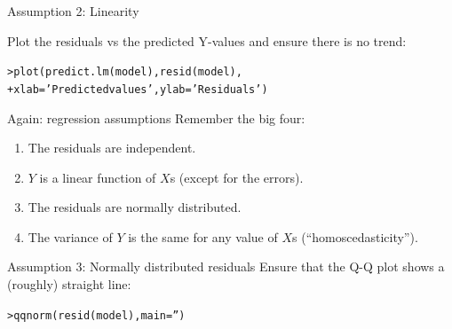 \documentclass{beamer}\usepackage[]{graphicx}\usepackage[]{color}
\makeatletter
\newcommand{\hlstr}[1]{\textcolor[rgb]{1,0.894,0.71}{#1}}%
\newcommand{\hlstd}[1]{\textcolor[rgb]{1,0.894,0.769}{#1}}%
\newcommand{\hlkwc}[1]{\textcolor[rgb]{0.78,0.941,0.545}{#1}}%
\newcommand{\hlkwd}[1]{\textcolor[rgb]{1,0.78,0.769}{#1}}%
\newenvironment{kframe}{%
 \def\at@end@of@kframe{}%
 \ifinner\ifhmode%
  \def\at@end@of@kframe{\end{minipage}}%
  \begin{minipage}{\columnwidth}%
 \fi\fi%
 \def\FrameCommand##1{\hskip\@totalleftmargin \hskip-\fboxsep
 \colorbox{shadecolor}{##1}\hskip-\fboxsep
     \hskip-\linewidth \hskip-\@totalleftmargin \hskip\columnwidth}%
 \MakeFramed {\advance\hsize-\width
   \@totalleftmargin\z@ \linewidth\hsize
   \@setminipage}}%
 {\par\unskip\endMakeFramed%
 \at@end@of@kframe}
\newenvironment{knitrout}{}{} %
\makeatother
\begin{document}
\begin{darkframes}
    
    
    \begin{frame}[fragile]{Assumption 2: Linearity}
    
      Plot the residuals vs the predicted Y-values and ensure there is no trend:
\begin{knitrout}
\begin{kframe}
\begin{alltt}
\hlstd{> }\hlkwd{plot}\hlstd{(}\hlkwd{predict.lm}\hlstd{(model),} \hlkwd{resid}\hlstd{(model),}
\hlstd{+ }  \hlkwc{xlab}\hlstd{=}\hlstr{'Predicted values'}\hlstd{,} \hlkwc{ylab}\hlstd{=}\hlstr{'Residuals'}\hlstd{)}
\end{alltt}
\end{kframe}


\end{knitrout}
    \end{frame}   
    
    
    \begin{frame}{Again: regression assumptions}
      Remember the big four:
      \begin{enumerate}
        \item The residuals are independent.
        \item $Y$ is a linear function of $X$s (except for the errors).
        \item \alert{The residuals are normally distributed.}
        \item The variance of $Y$ is the same for any value of $X$s (``homoscedasticity'').
      \end{enumerate}
    \end{frame}
    
    
    
    \begin{frame}[fragile]{Assumption 3: Normally distributed residuals}
      Ensure that the Q-Q plot shows a (roughly) straight line:
\begin{knitrout}
\begin{kframe}
\begin{alltt}
\hlstd{> }\hlkwd{qqnorm}\hlstd{(}\hlkwd{resid}\hlstd{(model),} \hlkwc{main}\hlstd{=}\hlstr{''}\hlstd{)}
\end{alltt}
\end{kframe}


\end{knitrout}
    \end{frame}
    

\end{darkframes}
\end{document}

